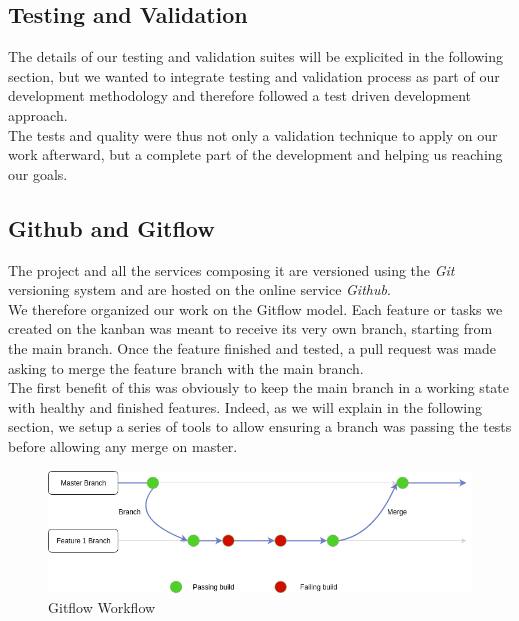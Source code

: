 \documentclass{eplmastersthesis}
\begin{document}
        \subsection{Testing and Validation}

          The details of our testing and validation suites will be explicited
          in the following section, but we wanted to integrate testing and
          validation process as part of our development methodology and
          therefore followed a test driven development approach.\\
          The tests and quality were thus not only a validation technique to
          apply on our work afterward, but a complete part of the development
          and helping us reaching our goals.

        \subsection{Github and Gitflow}

          The project and all the services composing it are versioned using the
          \textit{Git} versioning system and are hosted on the online service
          \textit{Github}.\\
          We therefore organized our work on the Gitflow model. Each feature or
          tasks we created on the kanban was meant to receive its very own
          branch, starting from the main branch.
          Once the feature finished and tested, a pull request was made asking
          to merge the feature branch with the main branch.\\
          The first benefit of this was obviously to keep the main branch in
          a working state with healthy and finished features. Indeed, as
          we will explain in the following section, we setup a series of tools
          to allow ensuring a branch was passing the tests before allowing any
          merge on master.\\

          \begin{figure}[H]
            \centering
            \includegraphics[scale=0.6]{figures/gitflow.png}
            \caption{\label{prev_arch} Gitflow Workflow}
          \end{figure}
\end{document}

